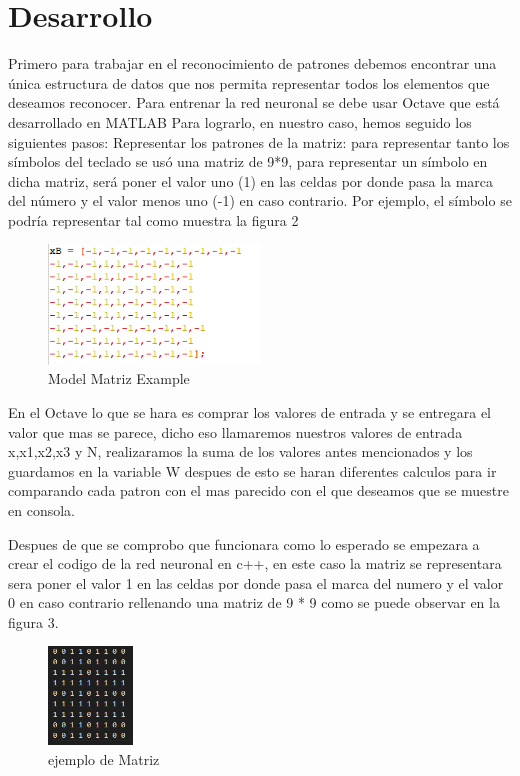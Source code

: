 \documentclass[10pt]{article}         %
\begin{document}
\section{Desarrollo}
Primero para trabajar en el reconocimiento de patrones debemos encontrar una única estructura de datos que nos permita representar todos los elementos que deseamos reconocer. Para entrenar la red neuronal se debe usar Octave que está desarrollado en MATLAB Para lograrlo, en nuestro caso, hemos seguido los siguientes pasos:
Representar los patrones de la matriz: para representar tanto los símbolos del teclado se usó una matriz de 9*9, para representar un símbolo en dicha matriz, será poner el valor uno (1) en las celdas por donde pasa la marca del número y el valor menos uno (-1) en caso contrario. Por ejemplo, el símbolo se podría representar tal como muestra la figura 2

\begin{figure}[htb]
\centering
\includegraphics[width=0.5\textwidth]{matriz.png}
\caption{Model Matriz Example}
\label{fig:tigre}
\end{figure}

En el Octave lo que se hara es comprar los valores de entrada y se entregara el valor que mas se parece, dicho eso llamaremos nuestros valores de entrada x,x1,x2,x3 y N, realizaramos la suma de los valores antes mencionados y los guardamos en la variable W despues de esto se haran diferentes calculos para ir comparando cada patron con el mas parecido con el que deseamos que se muestre en consola.

Despues de que se comprobo que funcionara como lo esperado se empezara a crear el codigo de la red neuronal en c++, en este caso la matriz se representara sera poner el valor 1 en las celdas por donde pasa el marca del numero y el valor 0 en caso contrario rellenando una matriz de 9 * 9 como se puede observar en la figura 3.

\begin{figure}[htb]
\centering
\includegraphics[width=0.2\textwidth]{matriz2.png}
\caption{ejemplo de Matriz}
\label{fig:tigre}
\end{figure}
\end{document}
